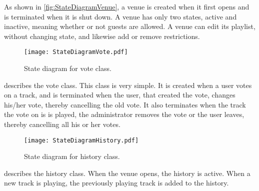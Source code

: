 As shown in \cref{fig:StateDiagramVenue}, a venue is created when it first opens and is terminated when it is shut down. A venue has only two states, active and inactive, meaning whether or not guests are allowed. A venue can edit its playlist, without changing state, and likewise add or remove restrictions.

\begin{figure}[H]
  \centering
  \texttt{[image: StateDiagramVote.pdf]}
  \caption{State diagram for vote class.}\label{fig:StateDiagramVote}
\end{figure}

 describes the vote class. This class is very simple. It is created when a user votes on a track, and is terminated when the user, that created the vote, changes his/her vote, thereby cancelling the old vote. It also terminates when the track the vote on is is played, the administrator removes the vote or the user leaves, thereby cancelling all his or her votes.

\begin{figure}[H]
  \centering
  \texttt{[image: StateDiagramHistory.pdf]}
  \caption{State diagram for history class.}\label{fig:StateDiagramHistory}
\end{figure}

 describes the history class. When the venue opens, the history is active. When a new track is playing, the previously playing track is added to the history.

